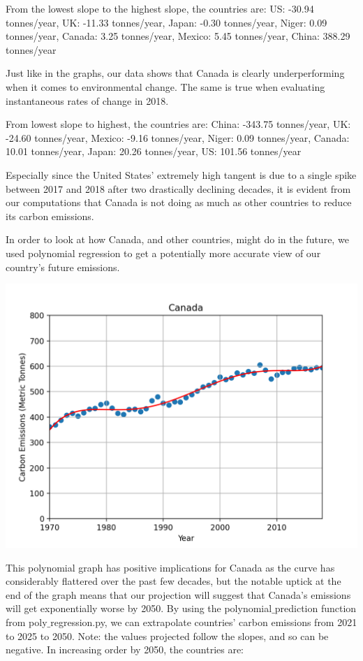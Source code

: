 \documentclass[fontsize=11pt]{article}
\begin{document}
    From the lowest slope to the highest slope, the countries are: US: -30.94 tonnes/year, UK: -11.33 tonnes/year, Japan: -0.30 tonnes/year, Niger: 0.09 tonnes/year, Canada: 3.25 tonnes/year, Mexico: 5.45 tonnes/year, China: 388.29 tonnes/year

    Just like in the graphs, our data shows that Canada is clearly underperforming when it comes to environmental change. The same is true when evaluating instantaneous rates of change in 2018.

    From lowest slope to highest, the countries are: China: -343.75 tonnes/year, UK: -24.60 tonnes/year, Mexico: -9.16 tonnes/year, Niger: 0.09 tonnes/year, Canada: 10.01 tonnes/year, Japan: 20.26 tonnes/year, US: 101.56 tonnes/year

    Especially since the United States' extremely high tangent is due to a single spike between 2017 and 2018 after two drastically declining decades, it is evident from our computations that Canada is not doing as much as other countries to reduce its carbon emissions.

    In order to look at how Canada, and other countries, might do in the future, we used polynomial regression to get a potentially more accurate view of our country's future emissions.

    \includegraphics[scale = 0.75]{canada_polynomial.png}

    This polynomial graph has positive implications for Canada as the curve has considerably flattered over the past few decades, but the notable uptick at the end of the graph means that our projection will suggest that Canada's emissions will get exponentially worse by 2050. By using the polynomial$\_$prediction function from poly$\_$regression.py, we can extrapolate countries' carbon emissions from 2021 to 2025 to 2050. Note: the values projected follow the slopes, and so can be negative. In increasing order by 2050, the countries are:
\end{document}
